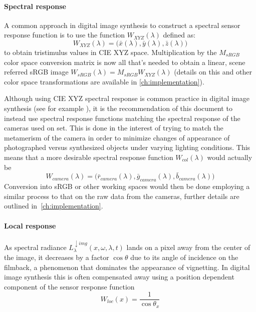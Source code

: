 \paragraph{Spectral response}
A common approach in digital image synthesis to construct a spectral sensor
response function is to use the function $W_{XYZ}(\lambda)$ defined as:
\begin{equation}
W_{XYZ}(\lambda) = \big(\bar x(\lambda), \bar y (\lambda), \bar z(\lambda)\big)
\end{equation}
to obtain tristimulus values in \gls{CIE} \gls{XYZ} space.
Multiplication by the $M_{sRGB}$ color space conversion matrix is now all
that's needed to obtain a linear, scene referred \gls{sRGB} image
$W_{sRGB}(\lambda) = M_{sRGB} W_{XYZ}(\lambda)$
(details on this and other color space transformations are available in
\cref{ch:implementation}).

Although using \gls{CIE} \gls{XYZ} spectral response is common practice
in digital image synthesis (see for example \cite{pharr2010, jakob2010,
ward1994}), it is the recommendation of this document to instead use spectral
response functions matching the spectral response of the cameras used on set.
This is done in the interest of trying to match the metamerism of the camera in
order to minimize changes of appearance of photographed versus synthesized
objects under varying lighting conditions. This means that a more desirable
spectral response function $W_{col}(\lambda)$ would actually be
\begin{equation}
W_{camera}(\lambda) = \big(\bar r_{camera}(\lambda), \bar g_{camera}(\lambda),
\bar b_{camera}(\lambda)\big)
\end{equation}
Conversion into \gls{sRGB} or other working spaces would then be done employing
a similar process to that on the raw data from the cameras, further details are
outlined in~\cref{ch:implementation}.


\paragraph{Local response}
As spectral radiance $L^{\downarrow img}_{\lambda}(x, \omega, \lambda, t)$ lands
on a pixel away from the center of the image, it decreases by a factor
$\cos\theta$ due to its angle of incidence on the filmback, a phenomenon that
dominates the appearance of vignetting. In digital image synthesis this is often
compensated away using a position dependent component of the sensor response
function
\begin{equation}
W_{loc}(x) = \frac{1}{\cos\theta_x}
\end{equation}


